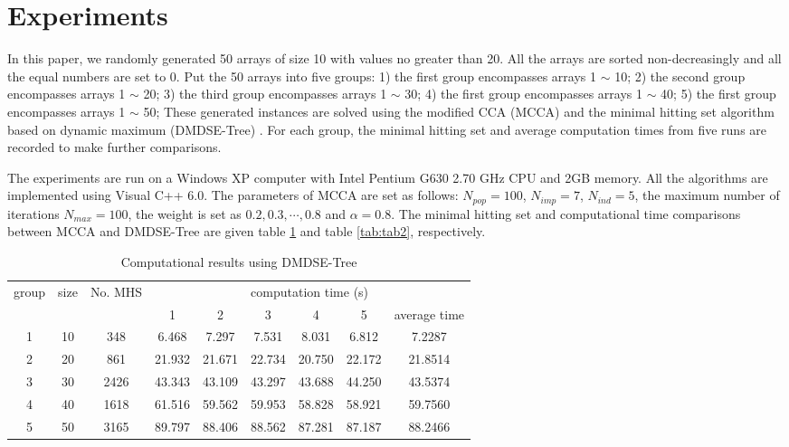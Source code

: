 \section{Experiments}
In this paper, we randomly generated 50 arrays of size 10 with values no greater than 20.
All the arrays are sorted non-decreasingly and all the equal numbers are set to 0.
Put the 50 arrays into five groups: 1) the first group encompasses arrays 1 $\sim$ 10; 2) the second group encompasses arrays 1 $\sim$ 20; 3) the third group encompasses arrays 1 $\sim$ 30; 4) the first group encompasses arrays 1 $\sim$ 40; 5) the first group encompasses arrays 1 $\sim$ 50;
These generated instances are solved using the modified CCA (MCCA) and the minimal hitting set algorithm based on dynamic maximum (DMDSE-Tree) \citep{c7zhang}.
For each group, the minimal hitting set and average computation times from five runs are recorded to make further comparisons.

The experiments are run on a Windows XP computer with Intel Pentium G630 2.70 GHz CPU and 2GB memory.
All the algorithms are implemented using Visual C++ 6.0.
The parameters of MCCA are set as follows: $N_{pop} = 100$, $N_{imp} = 7$, $N_{ind}  = 5$, the maximum number of iterations $N_{max} = 100$, the weight is set as $0.2, 0.3, \cdots, 0.8$ and $\alpha = 0.8$.
The minimal hitting set and computational time comparisons between MCCA and DMDSE-Tree are given table \ref{tab:tab1} and table \ref{tab:tab2}, respectively.

\begin{table}[h!]
	\begin{center}
		\caption{Computational results using DMDSE-Tree}
		\label{tab:tab1}
		\begin{tabular}{ccccccccc}
			\hline
			\multirow{2}{*}{group} & \multirow{2}{*}{size} & \multirow{2}{*}{No. MHS} & \multicolumn{6}{c}{computation time (s)} \\
			\cline{4-9}
			& & & 1 & 2 & 3 & 4 &5 & average time \\
			\hline 
			1 & 10 & 348  & 6.468  & 7.297  & 7.531  & 8.031  & 6.812  & 7.2287 \\
			2 & 20 & 861  & 21.932 & 21.671 & 22.734 & 20.750 & 22.172 & 21.8514 \\
			3 & 30 & 2426 & 43.343 & 43.109 & 43.297 & 43.688 & 44.250 & 43.5374 \\
			4 & 40 & 1618 & 61.516 & 59.562 & 59.953 & 58.828 & 58.921 & 59.7560 \\
			5 & 50 & 3165 & 89.797 & 88.406 & 88.562 & 87.281 & 87.187 & 88.2466 \\
			\hline
		\end{tabular}
	\end{center}
\end{table}



